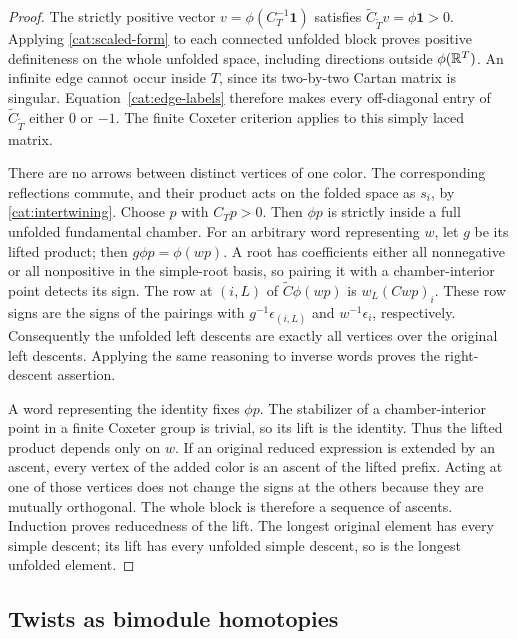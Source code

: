 \begin{proof}
The strictly positive vector $v=\phi(C_T^{-1}\mathbf1)$ satisfies
$\widetilde C_{\widetilde T}v=\phi\mathbf1>0$.  Applying
\eqref{cat:scaled-form} to each connected unfolded block proves
positive definiteness on the whole unfolded space, including
directions outside $\phi(\mathbb R^T)$.  An infinite edge cannot occur
inside $T$, since its two-by-two Cartan matrix is singular.
Equation~\eqref{cat:edge-labels} therefore makes every off-diagonal
entry of $\widetilde C_{\widetilde T}$ either $0$ or $-1$.  The
finite Coxeter criterion applies to this simply laced matrix.

There are no arrows between distinct vertices of one color.  The
corresponding reflections commute, and their product acts on the
folded space as $s_i$, by \eqref{cat:intertwining}.  Choose $p$ with
$C_Tp>0$.  Then $\phi p$ is strictly inside a full unfolded
fundamental chamber.  For an arbitrary word representing $w$, let $g$
be its lifted product; then $g\phi p=\phi(wp)$.  A root has coefficients either
all nonnegative or all nonpositive in the simple-root basis, so
pairing it with a chamber-interior point detects its sign.  The
row at $(i,L)$ of $\widetilde C\phi(wp)$ is $w_L(Cwp)_i$.
These row signs are the signs of the pairings with
$g^{-1}\epsilon_{(i,L)}$ and $w^{-1}\epsilon_i$, respectively.
Consequently the unfolded left descents are exactly all vertices
over the original left descents.  Applying the same reasoning to
inverse words proves the right-descent assertion.

A word representing the identity fixes $\phi p$.  The stabilizer
of a chamber-interior point in a finite Coxeter group is trivial,
so its lift is the identity.  Thus the lifted product depends only
on $w$.  If an original reduced expression is extended by an ascent,
every vertex of the added color is an ascent of the lifted prefix.
Acting at one of those vertices does not change the signs at the
others because they are mutually orthogonal.  The whole block is
therefore a sequence of ascents.  Induction proves reducedness of
the lift.  The longest original element has every simple descent;
its lift has every unfolded simple descent, so is the longest
unfolded element.
\end{proof}

\subsection{Twists as bimodule homotopies}

